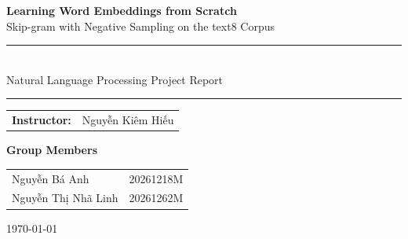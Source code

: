 \documentclass[a4paper,11pt]{article}
\begin{document}
\begin{titlepage}
    \centering
    \vspace*{3cm}

    {\LARGE\bfseries Learning Word Embeddings from Scratch}\\[0.4cm]
    {\Large Skip-gram with Negative Sampling on the text8 Corpus}\\[2cm]

    \rule{0.8\linewidth}{0.6pt}\\[0.5cm]
    {\large Natural Language Processing Project Report}\\[0.2cm]
    \rule{0.8\linewidth}{0.6pt}

    \vfill

    \begin{tabular}{ll}
        \textbf{Instructor:} & Nguyễn Kiêm Hiếu \\
    \end{tabular}

    \vspace{0.8cm}

    \textbf{Group Members}\\[0.3cm]
    \begin{tabular}{ll}
        Nguyễn Bá Anh & 20261218M \\
        Nguyễn Thị Nhã Linh & 20261262M \\
    \end{tabular}

    \vspace{1cm}
    {\large \today}

    \vspace*{1cm}
\end{titlepage}

\tableofcontents
\clearpage












\appendix

\end{document}
